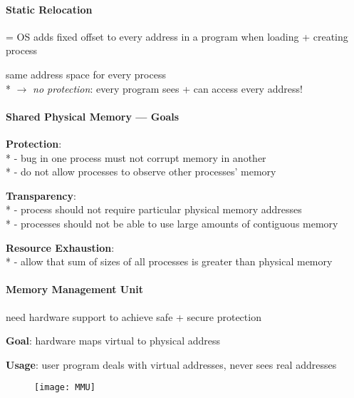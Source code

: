 \paragraph{Static Relocation}
\begin{items}
  \item = OS adds fixed offset to every address in a program when loading + creating process
  \item same address space for every process \\*
    \( \to \) \emph{no protection}: every program sees + can access every address!
\end{items}

\paragraph{Shared Physical Memory --- Goals}
\begin{items}
  \item \textbf{Protection}: \\*
    - bug in one process must not corrupt memory in another \\*
    - do not allow processes to observe other processes' memory
  \item \textbf{Transparency}: \\*
    - process should not require particular physical memory addresses \\*
    - processes should not be able to use large amounts of contiguous memory
  \item \textbf{Resource Exhaustion}: \\*
    - allow that sum of sizes of all processes is greater than physical memory
\end{items}

\paragraph{Memory Management Unit}
\begin{items}
  \item need hardware support to achieve safe + secure protection
  \item \textbf{Goal}: hardware maps virtual to physical address
  \item \textbf{Usage}: user program deals with virtual addresses, never sees real addresses
\end{items}
\begin{figure}[H]\centering\label{MMU}\texttt{[image: MMU]}\end{figure}

